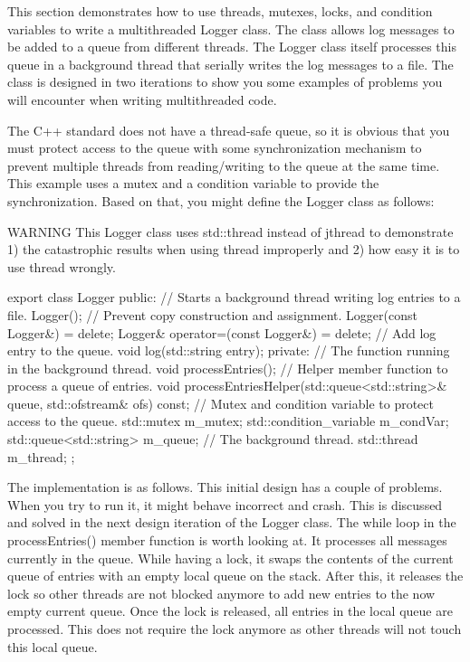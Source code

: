 This section demonstrates how to use threads, mutexes, locks, and condition variables to write a multithreaded Logger class. The class allows log messages to be added to a queue from different threads. The Logger class itself processes this queue in a background thread that serially writes the log messages to a file. The class is designed in two iterations to show you some examples of problems you will encounter when writing multithreaded code.

The C++ standard does not have a thread-safe queue, so it is obvious that you must protect access to the queue with some synchronization mechanism to prevent multiple threads from reading/writing to the queue at the same time. This example uses a mutex and a condition variable to provide the synchronization. Based on that, you might define the Logger class as follows:

\begin{myWarning}{WARNING}
This Logger class uses std::thread instead of jthread to demonstrate 1) the catastrophic results when using thread improperly and 2) how easy it is to use thread wrongly.
\end{myWarning}

\begin{cpp}
export class Logger
{
    public:
        // Starts a background thread writing log entries to a file.
        Logger();
        // Prevent copy construction and assignment.
        Logger(const Logger&) = delete;
        Logger& operator=(const Logger&) = delete;
        // Add log entry to the queue.
        void log(std::string entry);
    private:
        // The function running in the background thread.
        void processEntries();
        // Helper member function to process a queue of entries.
        void processEntriesHelper(std::queue<std::string>& queue,
            std::ofstream& ofs) const;
        // Mutex and condition variable to protect access to the queue.
        std::mutex m_mutex;
        std::condition_variable m_condVar;
        std::queue<std::string> m_queue;
        // The background thread.
        std::thread m_thread;
};
\end{cpp}

The implementation is as follows. This initial design has a couple of problems. When you try to run it, it might behave incorrect and crash. This is discussed and solved in the next design iteration of the Logger class. The while loop in the processEntries() member function is worth looking at. It processes all messages currently in the queue. While having a lock, it swaps the contents of the current queue of entries with an empty local queue on the stack. After this, it releases the lock so other threads are not blocked anymore to add new entries to the now empty current queue. Once the lock is released, all entries in the local queue are processed. This does not require the lock anymore as other threads will not touch this local queue.

